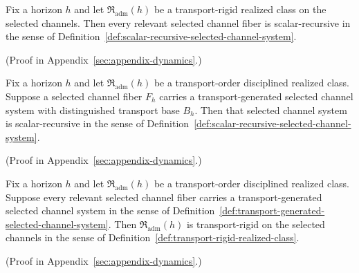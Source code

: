 \begin{corollary}
\label{cor:transport-rigid-implies-scalar-recursive}
Fix a horizon $h$ and let $\mathfrak R_{\mathrm{adm}}(h)$ be a transport-rigid
realized class on the selected channels. Then every relevant selected channel
fiber is scalar-recursive in the sense of
Definition~\ref{def:scalar-recursive-selected-channel-system}.
\end{corollary}

(Proof in Appendix~\ref{sec:appendix-dynamics}.)

\begin{corollary}
\label{cor:transport-generation-yields-scalar-recursive}
Fix a horizon $h$ and let $\mathfrak R_{\mathrm{adm}}(h)$ be a transport-order
disciplined realized class. Suppose a selected channel fiber $F_h$ carries a
transport-generated selected channel system with distinguished transport base
$B_h$. Then that selected channel system is scalar-recursive in the sense of
Definition~\ref{def:scalar-recursive-selected-channel-system}.
\end{corollary}

(Proof in Appendix~\ref{sec:appendix-dynamics}.)

\begin{corollary}
\label{cor:transport-generated-implies-transport-rigid}
Fix a horizon $h$ and let $\mathfrak R_{\mathrm{adm}}(h)$ be a transport-order
disciplined realized class. Suppose every relevant selected channel fiber
carries a transport-generated selected channel system in the sense of
Definition~\ref{def:transport-generated-selected-channel-system}. Then
$\mathfrak R_{\mathrm{adm}}(h)$ is transport-rigid on the selected channels in
the sense of Definition~\ref{def:transport-rigid-realized-class}.
\end{corollary}

(Proof in Appendix~\ref{sec:appendix-dynamics}.)

